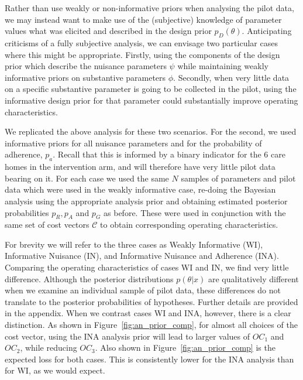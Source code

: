 \documentclass{article} %
\begin{document}
Rather than use weakly or non-informative priors when analysing the pilot data, we may instead want to make use of the (subjective) knowledge of parameter values what was elicited and described in the design prior $p_D(\theta)$. Anticipating criticisms of a fully subjective analysis, we can envisage two particular cases where this might be appropriate. Firstly, using the components of the design prior which describe the nuisance parameters $\psi$ while maintaining weakly informative priors on substantive parameters $\phi$. Secondly, when very little data on a specific substantive parameter is going to be collected in the pilot, using the informative design prior for that parameter could substantially improve operating characteristics.

We replicated the above analysis for these two scenarios. For the second, we used informative priors for all nuisance parameters and for the probability of adherence, $p_a$. Recall that this is informed by a binary indicator for the 6 care homes in the intervention arm, and will therefore have very little pilot data bearing on it. For each case we used the same $N$ samples of parameters and pilot data which were used in the weakly informative case, re-doing the Bayesian analysis using the appropriate analysis prior and obtaining estimated posterior probabilities $p_R, p_A$ and $p_G$ as before. These were used in conjunction with the same set of cost vectors $\mathcal{C}$ to obtain corresponding operating characteristics.

For brevity we will refer to the three cases as Weakly Informative (WI), Informative Nuisance (IN), and Informative Nuisance and Adherence (INA). Comparing the operating characteristics of cases WI and IN, we find very little difference. Although the posterior distributions $p(\theta | x)$ are qualitatively different when we examine an individual sample of pilot data, these differences do not translate to the posterior probabilities of hypotheses. Further details are provided in the appendix. When we contrast cases WI and INA, however, there is a clear distinction. As shown in Figure~\ref{fig:an_prior_comp}, for almost all choices of the cost vector, using the INA analysis prior will lead to larger values of $OC_1$ and $OC_2$, while reducing $OC_3$. Also shown in Figure~\ref{fig:an_prior_comp} is the expected loss for both cases. This is consistently lower for the INA analysis than for WI, as we would expect. 
\end{document}
